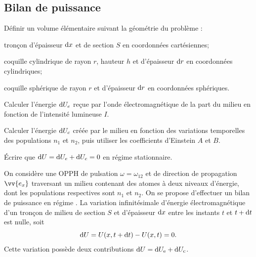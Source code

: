 \documentclass[12pt,fancy]{cours}
\begin{document}
\subsection{Bilan de puissance}

\begin{methode}
  \item	Définir un volume élémentaire suivant la géométrie du problème :
  \begin{liste}
    \item tronçon d'épaisseur $\mathrm{d} x$ et de section $S$ en coordonnées cartésiennes;
    \item coquille cylindrique de rayon $r$, hauteur $h$ et d'épaisseur $\mathrm{d} r$ en coordonnées cylindriques;
    \item coquille sphérique de rayon $r$ et d'épaisseur $\mathrm{d} r$ en coordonnées sphériques.
  \end{liste}
  \item Calculer l'énergie $\mathrm{d} U_e$ reçue par l'onde électromagnétique de la part du milieu en fonction de l'intensité lumineuse $I$.
  \item Calculer l'énergie $\mathrm{d} U_c$ créée par le milieu en fonction des variations temporelles des populations $n_1$ et $n_2$, puis utiliser les coefficients d'Einstein $A$ et $B$.
  \item Écrire que $\mathrm{d} U = \mathrm{d} U_e + \mathrm{d} U_c = 0$ en régime stationnaire.
\end{methode}
On considère une OPPH de pulsation $\omega =  \omega_{12}$ et de direction de propagation $\vv{e_x}$ traversant un milieu contenant des atomes à deux niveaux d'énergie, dont les populations respectives sont $n_1$ et $n_2$. On se propose d'effectuer un bilan de puissance en régime . La variation infinitésimale d'énergie électromagnétique d'un tronçon de milieu de section $S$ et d'épaisseur $\mathrm{d} x$ entre les instants $t$ et $t+\mathrm{d} t$ est nulle, soit
\begin{equation}
\mathrm{d} U = U(x,t+\mathrm{d} t)-U(x,t) = 0.
\end{equation}
Cette variation possède deux contributions $\mathrm{d} U = \mathrm{d} U_{\rm e} + \mathrm{d} U_{\rm c}$.
\end{document}
